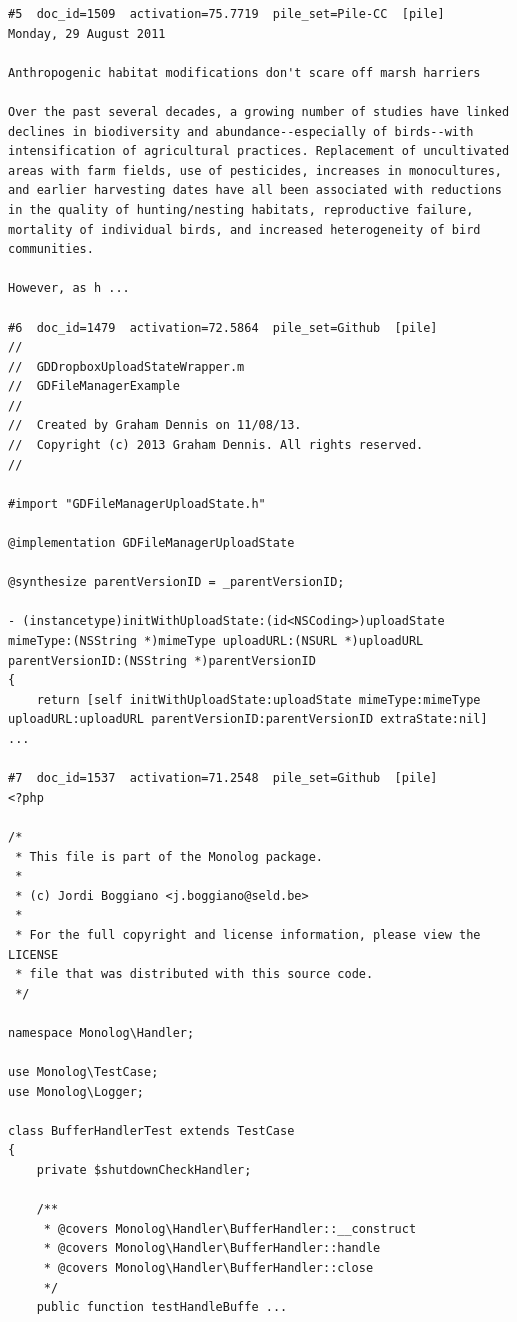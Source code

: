 \begin{verbatim}
#5  doc_id=1509  activation=75.7719  pile_set=Pile-CC  [pile]
Monday, 29 August 2011

Anthropogenic habitat modifications don't scare off marsh harriers

Over the past several decades, a growing number of studies have linked declines in biodiversity and abundance--especially of birds--with intensification of agricultural practices. Replacement of uncultivated areas with farm fields, use of pesticides, increases in monocultures, and earlier harvesting dates have all been associated with reductions in the quality of hunting/nesting habitats, reproductive failure, mortality of individual birds, and increased heterogeneity of bird communities.

However, as h ...

#6  doc_id=1479  activation=72.5864  pile_set=Github  [pile]
//
//  GDDropboxUploadStateWrapper.m
//  GDFileManagerExample
//
//  Created by Graham Dennis on 11/08/13.
//  Copyright (c) 2013 Graham Dennis. All rights reserved.
//

#import "GDFileManagerUploadState.h"

@implementation GDFileManagerUploadState

@synthesize parentVersionID = _parentVersionID;

- (instancetype)initWithUploadState:(id<NSCoding>)uploadState mimeType:(NSString *)mimeType uploadURL:(NSURL *)uploadURL parentVersionID:(NSString *)parentVersionID
{
    return [self initWithUploadState:uploadState mimeType:mimeType uploadURL:uploadURL parentVersionID:parentVersionID extraState:nil] ...

#7  doc_id=1537  activation=71.2548  pile_set=Github  [pile]
<?php

/*
 * This file is part of the Monolog package.
 *
 * (c) Jordi Boggiano <j.boggiano@seld.be>
 *
 * For the full copyright and license information, please view the LICENSE
 * file that was distributed with this source code.
 */

namespace Monolog\Handler;

use Monolog\TestCase;
use Monolog\Logger;

class BufferHandlerTest extends TestCase
{
    private $shutdownCheckHandler;

    /**
     * @covers Monolog\Handler\BufferHandler::__construct
     * @covers Monolog\Handler\BufferHandler::handle
     * @covers Monolog\Handler\BufferHandler::close
     */
    public function testHandleBuffe ...


\end{verbatim}
